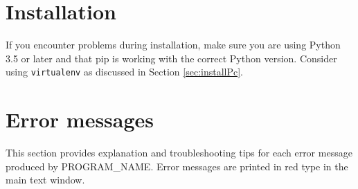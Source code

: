 \documentclass[11pt,letterpaper,article,oneside]{memoir}
\newcommand{\name}{PROGRAM\_NAME}
\begin{document}
\section{Installation}

If you encounter problems during installation, make sure you are using Python
3.5 or later and that pip is working with the correct Python version. Consider
using \texttt{virtualenv} as discussed in Section \ref{sec:installPc}.


\section{Error messages}

\newcommand{\genericFix}{Try resetting the Arduino.  Make sure that the Arduino
is correctly powered and connected to the PC (Section \ref{sec:wiring}), and
that the correct code is installed on the Arduino (Section
\ref{sec:installarduinocode}).}

This section provides explanation and troubleshooting tips for each error
message produced by \name{}. Error messages are printed in red type in the main
text window.
\end{document}
